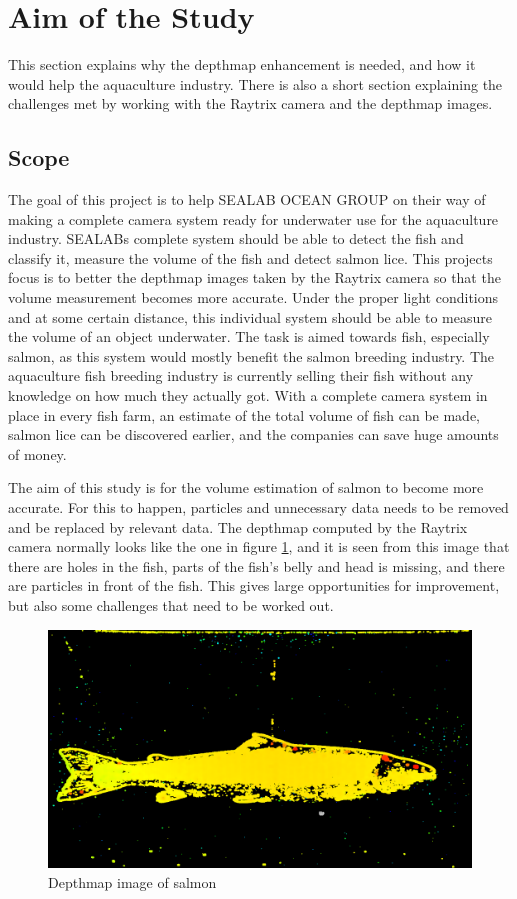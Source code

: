 \section{Aim of the Study}\label{aim of study}

This section explains why the depthmap enhancement is needed, and how it would help the aquaculture industry. There is also a short section explaining the challenges met by working with the Raytrix camera and the depthmap images.

\subsection{Scope}

The goal of this project is to help SEALAB OCEAN GROUP on their way of making a complete camera system ready for underwater use for the aquaculture industry. SEALABs complete system should be able to detect the fish and classify it, measure the volume of the fish and detect salmon lice.
This projects focus is to better the depthmap images taken by the Raytrix camera so that the volume measurement becomes more accurate. Under the proper light conditions and at some certain distance, this individual system should be able to measure the volume of an object underwater. The task is aimed towards fish, especially salmon, as this system would mostly benefit the salmon breeding industry.
The aquaculture fish breeding industry is currently selling their fish without any knowledge on how much they actually got. With a complete camera system in place in every fish farm, an estimate of the total volume of fish can be made, salmon lice can be discovered earlier, and the companies can save huge amounts of money. 

The aim of this study is for the volume estimation of salmon to become more accurate. For this to happen, particles and unnecessary data needs to be removed and be replaced by relevant data. The depthmap computed by the Raytrix camera normally looks like the one in figure \ref{fig:depthmap82}, and it is seen from this image that there are holes in the fish, parts of the fish's belly and head is missing, and there are particles in front of the fish. This gives large opportunities for improvement, but also some challenges that need to be worked out.

\begin{figure}[H]
    \centering
    \includegraphics[width=.7\linewidth]{images/aim_of_study/depthmap82}
    \caption{Depthmap image of salmon}
    \label{fig:depthmap82}
\end{figure}


